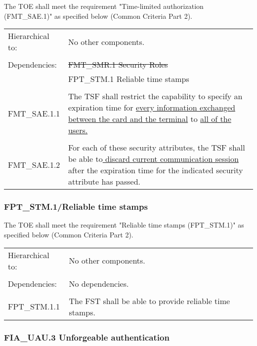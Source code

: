 \documentclass[10pt,titlepage]{article}
\begin{document}
The TOE shall meet the requirement "Time-limited authorization (FMT\_SAE.1)" as specified below (Common Criteria Part 2).
\begin{table}[!ht]
	\begin{tabular}{ p{3cm}  p{10cm} }
			Hierarchical to:& No other components. \\ 
									&\\
			Dependencies: & \sout{FMT\_SMR.1 Security Roles} \\
									& FPT\_STM.1 Reliable time stamps \\
									&\\
			FMT\_SAE.1.1	&	The TSF shall restrict the capability to specify an expiration time for \underline{every
information exchanged between the card and the terminal} to \underline{all of
the users.}\\
									&\\
	        FMT\_SAE.1.2	&	For each of these security attributes, the TSF shall be able to\underline{ discard
current communication session} after the expiration time for the indicated security attribute has passed.

	 \end{tabular}
 \end{table}
\subsubsection{FPT\_STM.1/Reliable time stamps}

The TOE shall meet the requirement "Reliable time stamps (FPT\_STM.1)" as specified below (Common Criteria Part 2).
\begin{table}[!ht]
	\begin{tabular}{ p{3cm}  p{10cm} }
			Hierarchical to:& No other components. \\ 
									&\\
			Dependencies: & No dependencies.\\
									&\\
			FPT\_STM.1.1	&	The FST shall be able to provide reliable time stamps.\\

	 \end{tabular}
 \end{table}
 
 \subsubsection{FIA\_UAU.3 Unforgeable authentication}
\end{document}
